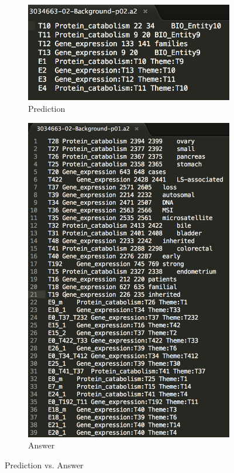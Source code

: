 \begin{figure}[h]
	\centering
	\begin{subfigure}[b]{0.3\textwidth}
		\includegraphics[width=\textwidth]{prediction}
		\caption{Prediction}
		\label{fig:prediction}
	\end{subfigure}             
	\begin{subfigure}[b]{0.3\textwidth}
		\includegraphics[width=\textwidth]{answer}
		\caption{Answer}
		\label{fig:answer}   
	\end{subfigure}
	\caption{Prediction vs. Answer}
	\label{fig:prediction_answer}
\end{figure}
